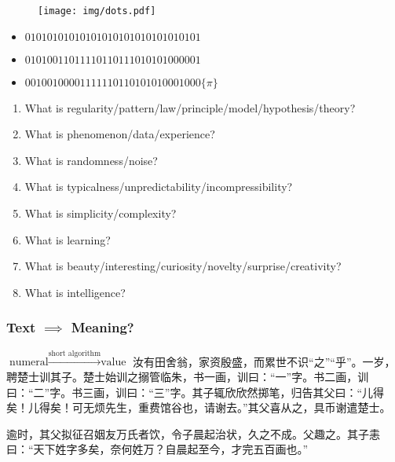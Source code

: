 \documentclass[UTF8,11pt,colorlinks,compress,openany]{beamer}%
\begin{document}
\begin{frame}\frametitle{}
			\begin{figure}
				\texttt{[image: img/dots.pdf]}
			\end{figure}
			\begin{itemize}
				\item $01010101010101010101010101010101$
				\item $01010011011110110111010101000001$
				\item $00100100001111110110101010001000$\hfill$\{\pi\}$
			\end{itemize}
	\begin{enumerate}
		\item What is regularity/pattern/law/principle/model/hypothesis/theory?
		\item What is phenomenon/data/experience?
		\item What is randomness/noise?
		\item What is typicalness/unpredictability/incompressibility?
		\item What is simplicity/complexity?
		\item What is learning?
		\item What is beauty/interesting/curiosity/novelty/surprise/creativity?
		\item What is intelligence?
	\end{enumerate}
\end{frame}

\begin{frame}\frametitle{Text $\implies$ Meaning?}
\begin{block}{$\mbox{numeral}\xrightarrow{\text{short algorithm}}\mbox{value}$}
汝有田舍翁，家资殷盛，而累世不识“之”“乎”。一岁，聘楚士训其子。楚士始训之搦管临朱，书一画，训曰：“一”字。书二画，训曰：“二”字。书三画，训曰：“三”字。其子辄欣欣然掷笔，归告其父曰：“儿得矣！儿得矣！可无烦先生，重费馆谷也，请谢去。”其父喜从之，具币谢遣楚士。

逾时，其父拟征召姻友万氏者饮，令子晨起治状，久之不成。父趣之。其子恚曰：“天下姓字多矣，奈何姓万？自晨起至今，才完五百画也。”
\end{block}
\end{frame}
\end{document}
